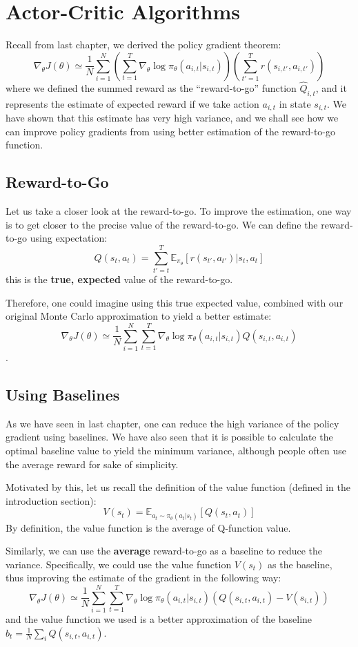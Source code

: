 \chapter{Actor-Critic Algorithms}
Recall from last chapter, we derived the policy gradient theorem:
$$\nabla_\theta J(\theta) \simeq \frac{1}{N}\sum_{i=1}^N\left(\sum_{t=1}^T\nabla_\theta \log\pi_\theta(a_{i,t}|s_{i,t})\right)\left(\sum_{t'=1}^T r(s_{i,t'},a_{i,t'})\right)$$
where we defined the summed reward as the ``reward-to-go'' function $\hat{Q}_{i,t}$, and it represents the estimate of expected reward if we take action $a_{i,t}$ in state $s_{i,t}$. We have shown that this estimate has very high variance, and we shall see how we can improve policy gradients from using better estimation of the reward-to-go function.

\section{Reward-to-Go}
Let us take a closer look at the reward-to-go. To improve the estimation, one way is to get closer to the precise value of the reward-to-go. We can define the reward-to-go using expectation:
$$Q(s_t,a_t) = \sum_{t'=t}^T \mathbb{E}_{\pi_\theta}\left[r(s_{t'},a_{t'})|s_t,a_t\right]$$
this is the \textbf{true, expected} value of the reward-to-go.

Therefore, one could imagine using this true expected value, combined with our original Monte Carlo approximation to yield a better estimate:
$$\nabla_\theta J(\theta) \simeq \frac{1}{N}\sum_{i=1}^N\sum_{t=1}^T\nabla_{\theta}\log \pi_\theta (a_{i,t}|s_{i,t})Q(s_{i,t},a_{i,t})$$.

\section{Using Baselines}
As we have seen in last chapter, one can reduce the high variance of the policy gradient using baselines. We have also seen that it is possible to calculate the optimal baseline value to yield the minimum variance, although people often use the average reward for sake of simplicity.

Motivated by this, let us recall the definition of the value function (defined in the introduction section):
$$V(s_t) = \mathbb{E}_{a_t\sim \pi_\theta(a_t|s_t)}\left[Q(s_t,a_t)\right]$$
By definition, the value function is the average of Q-function value.

Similarly, we can use the \textbf{average} reward-to-go as a baseline to reduce the variance. Specifically, we could use the value function $V(s_t)$ as the baseline, thus improving the estimate of the gradient in the following way:
$$\nabla_\theta J(\theta) \simeq \frac{1}{N}\sum_{i=1}^N\sum_{t=1}^T\nabla_{\theta}\log \pi_\theta (a_{i,t}|s_{i,t})\left(Q(s_{i,t},a_{i,t}) - V(s_{i,t})\right)$$
and the value function we used is a better approximation of the baseline $b_t = \frac{1}{N}\sum_i Q(s_{i,t},a_{i,t})$.

